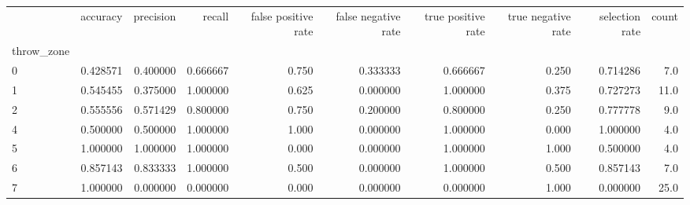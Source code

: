 \begin{tabular}{lrrrrrrrrr}
\toprule
{} &  accuracy &  precision &    recall &  false positive rate &  false negative rate &  true positive rate &  true negative rate &  selection rate &  count \\
throw\_zone &           &            &           &                      &                      &                     &                     &                 &        \\
\midrule
0          &  0.428571 &   0.400000 &  0.666667 &                0.750 &             0.333333 &            0.666667 &               0.250 &        0.714286 &    7.0 \\
1          &  0.545455 &   0.375000 &  1.000000 &                0.625 &             0.000000 &            1.000000 &               0.375 &        0.727273 &   11.0 \\
2          &  0.555556 &   0.571429 &  0.800000 &                0.750 &             0.200000 &            0.800000 &               0.250 &        0.777778 &    9.0 \\
4          &  0.500000 &   0.500000 &  1.000000 &                1.000 &             0.000000 &            1.000000 &               0.000 &        1.000000 &    4.0 \\
5          &  1.000000 &   1.000000 &  1.000000 &                0.000 &             0.000000 &            1.000000 &               1.000 &        0.500000 &    4.0 \\
6          &  0.857143 &   0.833333 &  1.000000 &                0.500 &             0.000000 &            1.000000 &               0.500 &        0.857143 &    7.0 \\
7          &  1.000000 &   0.000000 &  0.000000 &                0.000 &             0.000000 &            0.000000 &               1.000 &        0.000000 &   25.0 \\
\bottomrule
\end{tabular}
